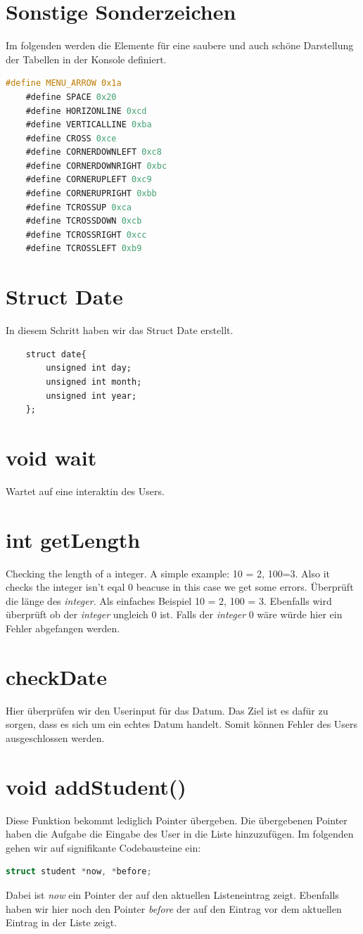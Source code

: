 \documentclass[a4paper, 11pt, oneside]{book} %
\begin{document}
\section{Sonstige Sonderzeichen}
Im folgenden werden die Elemente für eine saubere und auch schöne Darstellung der Tabellen in der Konsole definiert.
\begin{lstlisting}[language=C]
	#define MENU_ARROW 0x1a
	#define SPACE 0x20
	#define HORIZONLINE 0xcd
	#define VERTICALLINE 0xba
	#define CROSS 0xce
	#define CORNERDOWNLEFT 0xc8 
	#define CORNERDOWNRIGHT 0xbc 
	#define CORNERUPLEFT 0xc9 
	#define CORNERUPRIGHT 0xbb 
	#define TCROSSUP 0xca 
	#define TCROSSDOWN 0xcb 
	#define TCROSSRIGHT 0xcc 
	#define TCROSSLEFT 0xb9 
\end{lstlisting}

\section{Struct Date}
In diesem Schritt haben wir das Struct Date erstellt.
\begin{lstlisting}
	struct date{
        unsigned int day;
        unsigned int month;
        unsigned int year;
	};
\end{lstlisting}
\section{void wait}
Wartet auf eine interaktin des Users.
\section{int getLength}
Checking the length of a integer. A simple example: 10 = 2, 100=3. Also it checks the integer isn't eqal 0 beacuse in this case we get some errors.
Überprüft die länge des \textit{integer}. Als einfaches Beispiel 10 = 2, 100 = 3. Ebenfalls wird überprüft ob der \textit{integer} ungleich 0 ist. Falls der \textit{integer} 0 wäre würde hier ein Fehler abgefangen werden.

\section{checkDate}
Hier überprüfen wir den Userinput für das Datum. Das Ziel ist es dafür zu sorgen, dass es sich um ein echtes Datum handelt. Somit können Fehler des Users ausgeschlossen werden.

\section{void addStudent()}
Diese Funktion bekommt lediglich Pointer übergeben. Die übergebenen Pointer haben die Aufgabe die Eingabe des User in die Liste hinzuzufügen. Im folgenden gehen wir auf signifikante Codebausteine ein:
\begin{lstlisting}[language=C]
	struct student *now, *before;
\end{lstlisting}
Dabei ist \textit{now} ein Pointer der auf den aktuellen Listeneintrag zeigt. Ebenfalls haben wir hier noch den Pointer \textit{before} der auf den Eintrag vor dem aktuellen Eintrag in der Liste zeigt.
\end{document}
